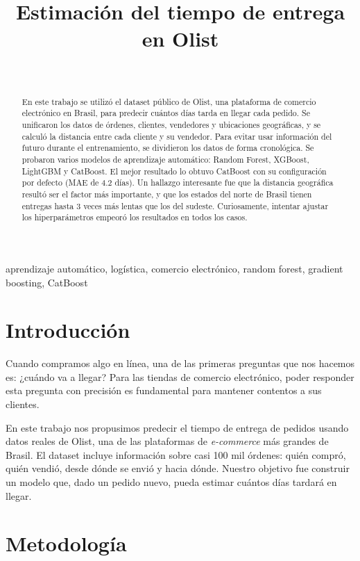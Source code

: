 \documentclass[journal]{IEEEtran}
\title{Estimación del tiempo de entrega en Olist}
\author{
  \IEEEauthorblockN{Kenneth Eduardo Barboza Corrales\IEEEauthorrefmark{1} \and David Alberto Guevara Sánchez\IEEEauthorrefmark{1}}\\
  \IEEEauthorblockA{\IEEEauthorrefmark{1}Maestría en Ciencias de la Computación, Tecnológico de Costa Rica}
}
\begin{document}
\maketitle

\begin{abstract}
	En este trabajo se utilizó el dataset público de Olist\cite{olist_dataset}, una plataforma de comercio electrónico en Brasil, para predecir cuántos días tarda en llegar cada pedido. Se unificaron los datos de órdenes, clientes, vendedores y ubicaciones geográficas, y se calculó la distancia entre cada cliente y su vendedor. Para evitar usar información del futuro durante el entrenamiento, se dividieron los datos de forma cronológica. Se probaron varios modelos de aprendizaje automático: Random Forest, XGBoost, LightGBM\cite{ke2017lightgbm} y CatBoost\cite{prokhorenkova2018catboost}. El mejor resultado lo obtuvo CatBoost con su configuración por defecto (MAE de 4.2 días). Un hallazgo interesante fue que la distancia geográfica resultó ser el factor más importante, y que los estados del norte de Brasil tienen entregas hasta 3 veces más lentas que los del sudeste. Curiosamente, intentar ajustar los hiperparámetros empeoró los resultados en todos los casos.
\end{abstract}

\begin{IEEEkeywords}
	aprendizaje automático, logística, comercio electrónico, random forest, gradient boosting, CatBoost
\end{IEEEkeywords}

\section{Introducción}

Cuando compramos algo en línea, una de las primeras preguntas que nos hacemos es: ¿cuándo va a llegar? Para las tiendas de comercio electrónico, poder responder esta pregunta con precisión es fundamental para mantener contentos a sus clientes.

En este trabajo nos propusimos predecir el tiempo de entrega de pedidos usando datos reales de Olist\cite{olist_dataset}, una de las plataformas de \textit{e-commerce} más grandes de Brasil. El dataset incluye información sobre casi 100 mil órdenes: quién compró, quién vendió, desde dónde se envió y hacia dónde. Nuestro objetivo fue construir un modelo que, dado un pedido nuevo, pueda estimar cuántos días tardará en llegar.

\section{Metodología}
\end{document}
